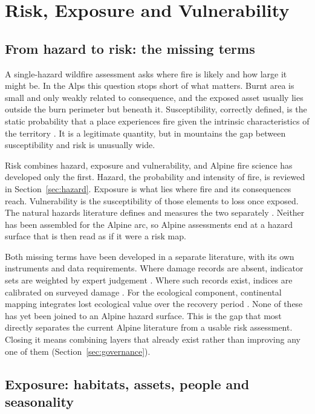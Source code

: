 \documentclass[11pt,a4paper]{article}
\begin{document}
\section{Risk, Exposure and Vulnerability}
\label{sec:risk}

\subsection{From hazard to risk: the missing terms}

A single-hazard wildfire assessment asks where fire is likely and how large it might be. In the Alps this question stops short of what matters. Burnt area is small and only weakly related to consequence, and the exposed asset usually lies outside the burn perimeter but beneath it. Susceptibility, correctly defined, is the static probability that a place experiences fire given the intrinsic characteristics of the territory \citep{trucchia_defining_2022}. It is a legitimate quantity, but in mountains the gap between susceptibility and risk is unusually wide.

Risk combines hazard, exposure and vulnerability, and Alpine fire science has developed only the first. Hazard, the probability and intensity of fire, is reviewed in Section~\ref{sec:hazard}. Exposure is what lies where fire and its consequences reach. Vulnerability is the susceptibility of those elements to loss once exposed. The natural hazards literature defines and measures the two separately \citep{papathomakohle_towards_2025}. Neither has been assembled for the Alpine arc, so Alpine assessments end at a hazard surface that is then read as if it were a risk map.

Both missing terms have been developed in a separate literature, with its own instruments and data requirements. Where damage records are absent, indicator sets are weighted by expert judgement \citep{papathomakohle_towards_2025}. Where such records exist, indices are calibrated on surveyed damage \citep{papathomakohle_wildfire_2022}. For the ecological component, continental mapping integrates lost ecological value over the recovery period \citep{arrogantefunes_mapping_2024}. None of these has yet been joined to an Alpine hazard surface. This is the gap that most directly separates the current Alpine literature from a usable risk assessment. Closing it means combining layers that already exist rather than improving any one of them (Section~\ref{sec:governance}).

\subsection{Exposure: habitats, assets, people and seasonality}
\end{document}
